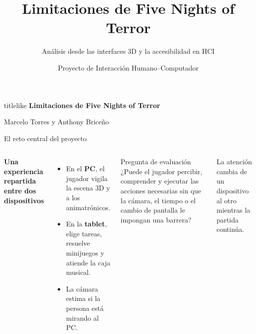 \documentclass[aspectratio=169,11pt]{beamer}
\title{Limitaciones de Five Nights of Terror}
\subtitle{Análisis desde las interfaces 3D y la accesibilidad en HCI}
\author{Proyecto de Interacción Humano--Computador}
\institute{Análisis del prototipo Unity + Flutter}
\date{}
\newcommand{\tagline}[1]{{\color{Teal}\bfseries\small #1}}
\newcommand{\smallnote}[1]{{\color{Muted}\scriptsize #1}}
\newcommand{\strong}[1]{{\color{Navy}\bfseries #1}}
\begin{document}
\begin{frame}[plain]
  \begin{beamercolorbox}[wd=\paperwidth,ht=\paperheight,sep=1.2cm,center]{titlelike}
    {\LARGE\bfseries Limitaciones de Five Nights of Terror}\par\vspace{.55cm}
    {\large Marcelo Torres y Anthony Briceño}\par\vspace{1cm}
  \end{beamercolorbox}
\end{frame}

\begin{frame}{El reto central del proyecto}
  \begin{columns}[T,onlytextwidth]
      \tagline{Una experiencia repartida entre dos dispositivos}
      \vspace{.35em}
      \begin{itemize}
        \item En el \strong{PC}, el jugador vigila la escena 3D y a los animatrónicos.
        \item En la \strong{tablet}, elige tareas, resuelve minijuegos y atiende la caja musical.
        \item La cámara estima si la persona está mirando al PC.
      \end{itemize}
      \vspace{.15em}
      \begin{block}{Pregunta de evaluación}
        ¿Puede el jugador percibir, comprender y ejecutar las acciones necesarias sin que la cámara, el tiempo o el cambio de pantalla le impongan una barrera?
      \end{block}
      \centering
      \vspace{.35cm}
      \vspace{.4cm}
      \smallnote{La atención cambia de un dispositivo al otro mientras la partida continúa.}
  \end{columns}
\end{frame}
\end{document}

